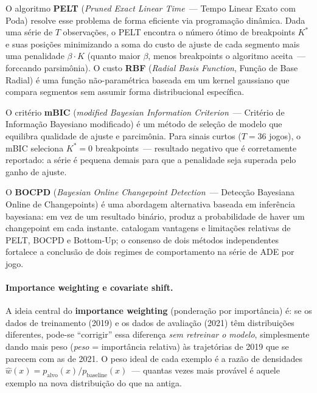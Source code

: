 \documentclass[11pt,a4paper]{article}
\begin{document}
O algoritmo \textbf{PELT} \cite{killick2012} (\emph{Pruned Exact Linear Time}~--- Tempo Linear Exato com Poda) resolve esse problema de forma eficiente via programa\c{c}\~ao din\^amica. Dada uma s\'erie de $T$ observa\c{c}\~oes, o PELT encontra o n\'umero \'otimo de breakpoints $K^*$ e suas posi\c{c}\~oes minimizando a soma do custo de ajuste de cada segmento mais uma penalidade $\beta \cdot K$ (quanto maior $\beta$, menos breakpoints o algoritmo aceita~--- forc{c}ando parsim\^onia). O custo \textbf{RBF} (\emph{Radial Basis Function}, Fun\c{c}\~ao de Base Radial) \'e uma fun\c{c}\~ao n\~ao-param\'etrica baseada em um kernel gaussiano que compara segmentos sem assumir forma distribucional espec\'ifica.

O crit\'erio \textbf{mBIC} (\emph{modified Bayesian Information Criterion}~--- Crit\'erio de Informa\c{c}\~ao Bayesiano modificado) \'e um m\'etodo de sele\c{c}\~ao de modelo que equilibra qualidade de ajuste e parcim\^onia. Para sinais curtos ($T{=}36$ jogos), o mBIC seleciona $K^*{=}0$ breakpoints~--- resultado negativo que \'e corretamente reportado: a s\'erie \'e pequena demais para que a penalidade seja superada pelo ganho de ajuste.

O \textbf{BOCPD} \cite{adams2007} (\emph{Bayesian Online Changepoint Detection}~--- Detec\c{c}\~ao Bayesiana Online de Changepoints) \'e uma abordagem alternativa baseada em infer\^encia bayesiana: em vez de um resultado bin\'ario, produz a probabilidade de haver um changepoint em cada instante. \citet{aminikhanghahi2017} catalogam vantagens e limita\c{c}\~oes relativas de PELT, BOCPD e Bottom-Up; o consenso de dois m\'etodos independentes fortalece a conclus\~ao de dois regimes de comportamento na s\'erie de ADE por jogo.

\paragraph{Importance weighting e covariate shift.}
A ideia central do \textbf{importance weighting} (pondera\c{c}\~ao por import\^ancia) \'e: se os dados de treinamento (2019) e os dados de avalia\c{c}\~ao (2021) t\^em distribui\c{c}\~oes diferentes, pode-se ``corrigir'' essa diferen\c{c}a \emph{sem retreinar o modelo}, simplesmente dando mais peso (\emph{peso} = import\^ancia relativa) \`as trajet\'orias de 2019 que se parecem com as de 2021. O peso ideal de cada exemplo \'e a raz\~ao de densidades $\hat{w}(x) = p_\text{alvo}(x)/p_\text{baseline}(x)$~--- quantas vezes mais prov\'avel \'e aquele exemplo na nova distribui\c{c}\~ao do que na antiga.
\end{document}

